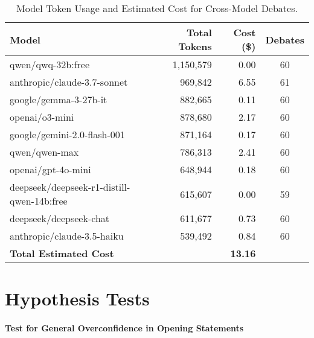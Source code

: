\documentclass{article}
\begin{document}
\begin{table}[h]
\centering
\caption{Model Token Usage and Estimated Cost for Cross-Model Debates.}
\label{tab:model_token_cost}
\begin{tabular}{lrrc}
\toprule
\textbf{Model} & \textbf{Total Tokens} & \textbf{Cost (\$)} & \textbf{Debates} \\
\midrule
qwen/qwq-32b:free                        & 1,150,579 & 0.00  & 60 \\
anthropic/claude-3.7-sonnet              & 969,842   & 6.55  & 61 \\
google/gemma-3-27b-it                    & 882,665   & 0.11  & 60 \\
openai/o3-mini                           & 878,680   & 2.17  & 60 \\
google/gemini-2.0-flash-001              & 871,164   & 0.17  & 60 \\
qwen/qwen-max                            & 786,313   & 2.41  & 60 \\
openai/gpt-4o-mini                       & 648,944   & 0.18  & 60 \\
deepseek/deepseek-r1-distill-qwen-14b:free & 615,607 & 0.00  & 59 \\
deepseek/deepseek-chat                   & 611,677   & 0.73  & 60 \\
anthropic/claude-3.5-haiku               & 539,492   & 0.84  & 60 \\
\midrule
\multicolumn{2}{l}{\textbf{Total Estimated Cost}} & \textbf{13.16} & \\
\bottomrule
\end{tabular}
\end{table}

\section{Hypothesis Tests}
\paragraph{Test for General Overconfidence in Opening Statements}
\label{appendix:test_overconfidence_opening}
\end{document}
